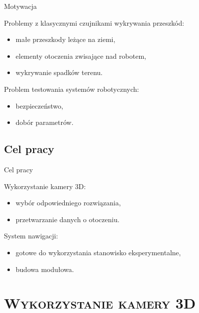 \documentclass[xcolor=x11names,compress]{beamer}
\renewcommand{\(}{\begin{columns}}
\renewcommand{\)}{\end{columns}}
\newcommand{\<}[1]{\begin{column}{#1}}
\renewcommand{\>}{\end{column}}
\begin{document}
\begin{frame}{Motywacja}

\alert{Problemy z klasycznymi czujnikami wykrywania przeszkód:}
\begin{itemize}
\item małe przeszkody leżące na ziemi,
\item elementy otoczenia zwisające nad robotem,
\item wykrywanie spadków terenu.
\end{itemize}

\vspace{.5cm}

\alert{Problem testowania systemów robotycznych:}
\begin{itemize}
\item bezpieczeństwo,
\item dobór parametrów.
\end{itemize}

\end{frame}

\subsection{Cel pracy}

\begin{frame}{Cel pracy}

\alert{Wykorzystanie kamery 3D:}
\begin{itemize}
\item wybór odpowiedniego rozwiązania,
\item przetwarzanie danych o otoczeniu.
\end{itemize}

\vspace{.5cm}

\alert{System nawigacji:}
\begin{itemize}
\item gotowe do wykorzystania stanowisko eksperymentalne,
\item budowa modułowa.
\end{itemize}

\end{frame}

\section{\scshape Wykorzystanie kamery 3D}
\end{document}
